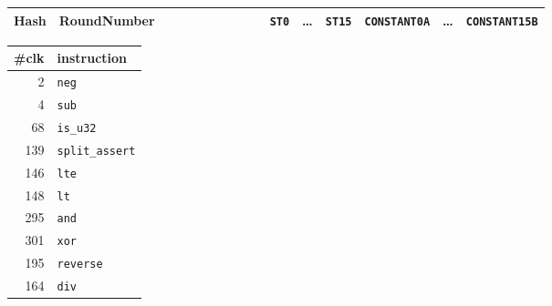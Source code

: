 \documentclass{article}
\begin{document}
{\begin{tabular}{lllllllllllllllllllllll}
    Hash        & \multicolumn{4}{l}{RoundNumber}                             &             &                   &              &                     &              &              &              &              & \texttt{ST0} & \dots & \texttt{ST15} & \multicolumn{3}{r}{\texttt{CONSTANT0A}}    & \dots & \multicolumn{3}{l}{\texttt{CONSTANT15B}}          \\ \bottomrule
\end{tabular}
} %
\vfill%
\begin{minipage}[t][0.6\textheight][s]{0.3\textwidth}
    \vfill
    \begin{tabular}{rl}
        \toprule
        \#clk & instruction            \\ \midrule
            2 & \texttt{neg}           \\
            4 & \texttt{sub}           \\
           68 & \texttt{is\_u32}       \\
          139 & \texttt{split\_assert} \\
          146 & \texttt{lte}           \\
          148 & \texttt{lt}            \\
          295 & \texttt{and}           \\
          301 & \texttt{xor}           \\
          195 & \texttt{reverse}       \\
          164 & \texttt{div}           \\ \bottomrule
    \end{tabular}
\end{minipage}%
\hfill%
\end{document}
